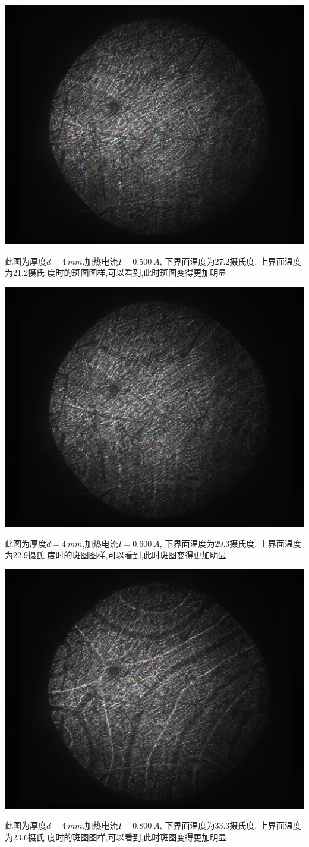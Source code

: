 \documentclass[aps,pre,12pt,preprint,onecolumn,showpacs,showkeys,floatfix]{revtex4-1}
\begin{document}
\begin{center}
    \includegraphics[width=.5\textwidth]{5.20/12.pdf}
\end{center}
    此图为厚度$d=\SI{4}{mm}$,加热电流$I=\SI{0.500}{A}$, 下界面温度为27.2摄氏度,
    上界面温度为21.2摄氏
    度时的斑图图样,可以看到,此时斑图变得更加明显

\begin{center}
    \includegraphics[width=.5\textwidth]{5.20/13.pdf}
\end{center}
    此图为厚度$d=\SI{4}{mm}$,加热电流$I=\SI{0.600}{A}$, 下界面温度为29.3摄氏度,
    上界面温度为22.9摄氏
    度时的斑图图样,可以看到,此时斑图变得更加明显.

\begin{center}
    \includegraphics[width=.5\textwidth]{5.20/14.pdf}
\end{center}
    此图为厚度$d=\SI{4}{mm}$,加热电流$I=\SI{0.800}{A}$, 下界面温度为33.3摄氏度,
    上界面温度为23.6摄氏
    度时的斑图图样,可以看到,此时斑图变得更加明显.
\end{document}

